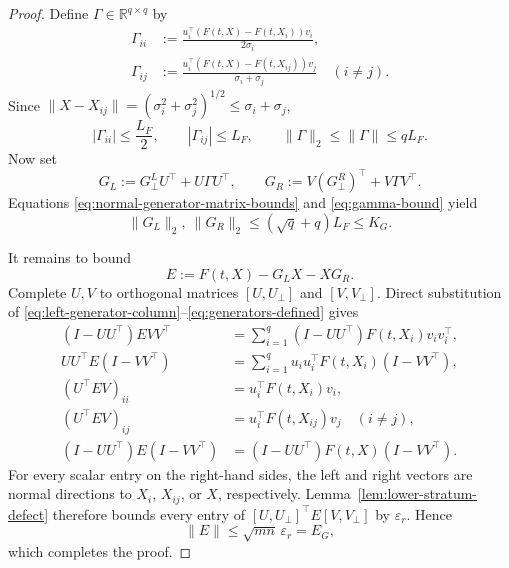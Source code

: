 \documentclass[10pt,a4paper]{amsart}
\newcommand{\R}{\mathbb{R}}
\newcommand{\eps}{\varepsilon}
\begin{document}
\begin{proof}
Define \(\Gamma\in\R^{q\times q}\) by
\begin{align}
 \Gamma_{ii}
 &:=\frac{u_i^\top(F(t,X)-F(t,X_i))v_i}{2\sigma_i},
                                                               \label{eq:gamma-diagonal}\\
 \Gamma_{ij}
 &:=\frac{u_i^\top(F(t,X)-F(t,X_{ij}))v_j}
          {\sigma_i+\sigma_j}
 \quad(i\ne j).                                      \label{eq:gamma-offdiagonal}
\end{align}
Since
\(\|X-X_{ij}\|=(\sigma_i^2+\sigma_j^2)^{1/2}
\le\sigma_i+\sigma_j\),
\begin{equation}\label{eq:gamma-bound}
 |\Gamma_{ii}|\le\frac{L_F}{2},\qquad
 |\Gamma_{ij}|\le L_F,\qquad
 \|\Gamma\|_2\le\|\Gamma\|\le qL_F.
\end{equation}
Now set
\begin{equation}\label{eq:generators-defined}
 G_L:=G_\perp^LU^\top+U\Gamma U^\top,
 \qquad
 G_R:=V(G_\perp^R)^\top+V\Gamma V^\top.
\end{equation}
Equations \eqref{eq:normal-generator-matrix-bounds} and
\eqref{eq:gamma-bound} yield
\begin{equation}\label{eq:generators-norm}
 \|G_L\|_2,\ \|G_R\|_2
 \le(\sqrt q+q)L_F\le K_G.
\end{equation}

It remains to bound
\begin{equation}\label{eq:generator-residual-defined}
 E:=F(t,X)-G_LX-XG_R.
\end{equation}
Complete \(U,V\) to orthogonal matrices \([U,U_\perp]\) and
\([V,V_\perp]\).  Direct substitution of
\eqref{eq:left-generator-column}--\eqref{eq:generators-defined} gives
\begin{align}
 (I-UU^\top)EVV^\top
 &=\sum_{i=1}^q (I-UU^\top)F(t,X_i)v_i v_i^\top,       \label{eq:residual-left-normal}\\
 UU^\top E(I-VV^\top)
 &=\sum_{i=1}^q u_i u_i^\top F(t,X_i)(I-VV^\top),      \label{eq:residual-right-normal}\\
 (U^\top EV)_{ii}
 &=u_i^\top F(t,X_i)v_i,                              \label{eq:residual-core-diagonal}\\
 (U^\top EV)_{ij}
 &=u_i^\top F(t,X_{ij})v_j\quad(i\ne j),              \label{eq:residual-core-offdiagonal}\\
 (I-UU^\top)E(I-VV^\top)
 &=(I-UU^\top)F(t,X)(I-VV^\top).                       \label{eq:residual-normal-normal}
\end{align}
For every scalar entry on the right-hand sides, the left and right vectors
are normal directions to \(X_i\), \(X_{ij}\), or \(X\), respectively.
Lemma~\ref{lem:lower-stratum-defect} therefore bounds every entry of
\([U,U_\perp]^\top E[V,V_\perp]\) by \(\eps_r\).  Hence
\begin{equation}\label{eq:generator-residual-bound}
 \|E\|\le\sqrt{mn}\,\eps_r=E_G,
\end{equation}
which completes the proof.
\end{proof}
\end{document}
